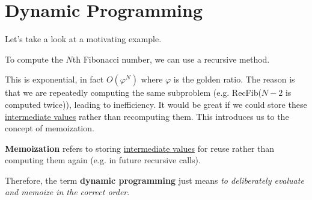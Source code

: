 \section{Dynamic Programming}
  
  Let's take a look at a motivating example. 

  \begin{example}
    \label{ex:computing-fibonacci-numbers}
    To compute the $N$th Fibonacci number, we can use a recursive method. 
    \begin{algorithm}[H]
      \caption{}
      \label{alg:recfib}
      \begin{algorithmic}
        \State 
            \State {}
            \State {}
          \Else 
            \State {}
          \EndIf
        \EndFunction
      \end{algorithmic}
    \end{algorithm}
  \end{example}

  This is exponential, in fact $O(\varphi^N)$ where $\varphi$ is the golden ratio. The reason is that we are repeatedly computing the same subproblem (e.g. RecFib($N-2$ is computed twice)), leading to inefficiency. It would be great if we could store these \hyperref[real-thm:intermediate-value-theorem]{intermediate values} rather than recomputing them. This introduces us to the concept of memoization. 

  \begin{definition}[Memoization]
    \label{def:memoization}
    \textbf{Memoization} refers to storing \hyperref[real-thm:intermediate-value-theorem]{intermediate values} for reuse rather than computing them again (e.g. in future recursive calls). 
    
    Therefore, the term \textbf{dynamic programming} just means \textit{to deliberately evaluate and memoize in the correct order}. 
  \end{definition}


